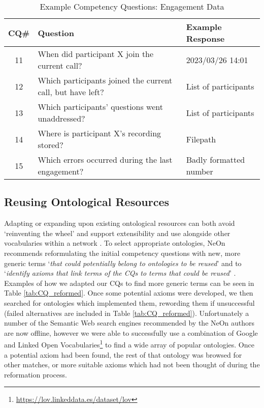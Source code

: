 \begin{table}
  \caption{Example Competency Questions: Engagement Data}
  \label{tab:CQ_data}
  \begin{tabular}{cll}
    \toprule
    CQ\#&Question&Example Response\\
    \midrule
    11&When did participant X join the current call?&2023/03/26 14:01\\
    12&Which participants joined the current call, but have left?&List of participants\\
    13&Which participants' questions went unaddressed?&List of participants\\
    14&Where is participant X’s recording stored?&Filepath\\
    15&Which errors occurred during the last engagement?&Badly formatted number\\
  \bottomrule
\end{tabular}
\end{table}

\subsection{Reusing Ontological Resources}

Adapting or expanding upon existing ontological resources can both avoid `reinventing the wheel' \cite{suarez2012} and support extensibility and use alongside other vocabularies within a network \cite{scherp2011}. To select appropriate ontologies, NeOn recommends reformulating the initial competency questions with new, more generic terms `\textit{that could potentially belong to ontologies to be reused}' and to `\textit{identify axioms that link terms of the CQs to terms that could be reused}' \cite{suarez2012_reuse}. Examples of how we adapted our CQs to find more generic terms can be seen in Table \ref{tab:CQ_reformed}. Once some potential axioms were developed, we then searched for ontologies which implemented them, rewording them if unsuccessful (failed alternatives are included in Table \ref{tab:CQ_reformed}). Unfortunately a number of the Semantic Web search engines recommended by the NeOn authors are now offline, however we were able to successfully use a combination of Google and Linked Open Vocabularies\footnote{\url{https://lov.linkeddata.es/dataset/lov}} to find a wide array of popular ontologies. Once a potential axiom had been found, the rest of that ontology was browsed for other matches, or more suitable axioms which had not been thought of during the reformation process. 

